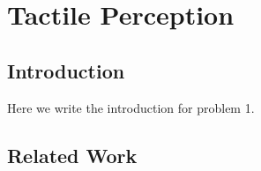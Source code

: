 \chapter{Tactile Perception} \label{ch:1-tactile-perception}

\section{Introduction} \label{sec:1-tactile-perception-introduction}
Here we write the introduction for problem 1.


\section{Related Work} \label{sec:1-tactile-perception-related-work}

